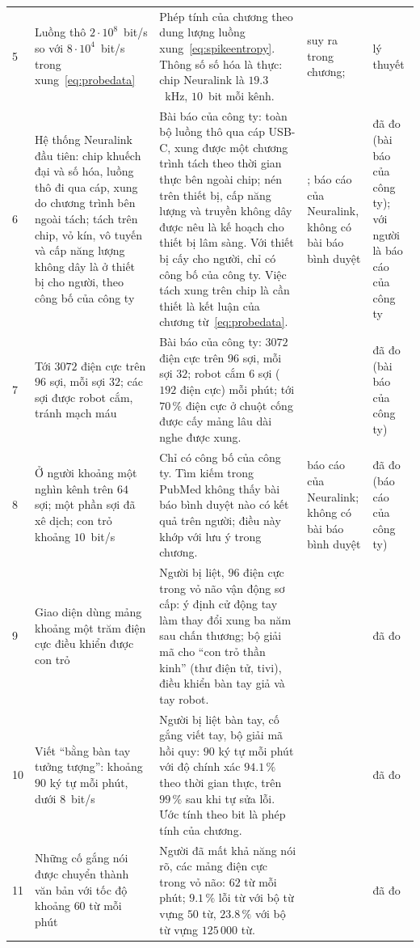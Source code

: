 {\begin{longtable}{>{\raggedright}p{0.5cm}>{\raggedright}p{4.0cm}>{\raggedright}p{5.6cm}>{\raggedright}p{2.3cm}>{\raggedright\arraybackslash}p{1.7cm}}
5 & Luồng thô $2\cdot10^8$~bit/s so với $8\cdot10^4$~bit/s trong xung~\eqref{eq:probedata} & Phép tính của chương theo dung lượng luồng xung~\eqref{eq:spikeentropy}. Thông số số hóa là thực: chip Neuralink là $19.3$~kHz, $10$~bit mỗi kênh. & suy ra trong chương; \cite{Rieke1997, Musk2019} & lý thuyết \\
6 & Hệ thống Neuralink đầu tiên: chip khuếch đại và số hóa, luồng thô đi qua cáp, xung do chương trình bên ngoài tách; tách trên chip, vỏ kín, vô tuyến và cấp năng lượng không dây là ở thiết bị cho người, theo công bố của công ty & Bài báo của công ty: toàn bộ luồng thô qua cáp USB-C, xung được một chương trình tách theo thời gian thực bên ngoài chip; nén trên thiết bị, cấp năng lượng và truyền không dây được nêu là kế hoạch cho thiết bị lâm sàng. Với thiết bị cấy cho người, chỉ có công bố của công ty. Việc tách xung trên chip là cần thiết là kết luận của chương từ~\eqref{eq:probedata}. & \cite{Musk2019}; báo cáo của Neuralink, không có bài báo bình duyệt & đã đo (bài báo của công ty); với người là báo cáo của công ty \\
7 & Tới $3072$ điện cực trên $96$ sợi, mỗi sợi $32$; các sợi được robot cắm, tránh mạch máu & Bài báo của công ty: $3072$ điện cực trên $96$ sợi, mỗi sợi $32$; robot cắm $6$ sợi ($192$ điện cực) mỗi phút; tới $70\,\%$ điện cực ở chuột cống được cấy mảng lâu dài nghe được xung. & \cite{Musk2019} & đã đo (bài báo của công ty) \\
8 & Ở người khoảng một nghìn kênh trên $64$ sợi; một phần sợi đã xê dịch; con trỏ khoảng $10$~bit/s & Chỉ có công bố của công ty. Tìm kiếm trong PubMed không thấy bài báo bình duyệt nào có kết quả trên người; điều này khớp với lưu ý trong chương. & báo cáo của Neuralink; không có bài báo bình duyệt & đã đo (báo cáo của công ty) \\
9 & Giao diện dùng mảng khoảng một trăm điện cực điều khiển được con trỏ & Người bị liệt, $96$ điện cực trong vỏ não vận động sơ cấp: ý định cử động tay làm thay đổi xung ba năm sau chấn thương; bộ giải mã cho ``con trỏ thần kinh'' (thư điện tử, tivi), điều khiển bàn tay giả và tay robot. & \cite{Hochberg2006} & đã đo \\
10 & Viết ``bằng bàn tay tưởng tượng'': khoảng $90$ ký tự mỗi phút, dưới $8$~bit/s & Người bị liệt bàn tay, cố gắng viết tay, bộ giải mã hồi quy: $90$ ký tự mỗi phút với độ chính xác $94.1\,\%$ theo thời gian thực, trên $99\,\%$ sau khi tự sửa lỗi. Ước tính theo bit là phép tính của chương. & \cite{Willett2021} & đã đo \\
11 & Những cố gắng nói được chuyển thành văn bản với tốc độ khoảng $60$ từ mỗi phút & Người đã mất khả năng nói rõ, các mảng điện cực trong vỏ não: $62$ từ mỗi phút; $9.1\,\%$ lỗi từ với bộ từ vựng $50$ từ, $23.8\,\%$ với bộ từ vựng $125\,000$ từ. & \cite{Willett2023} & đã đo \\

\end{longtable}}
